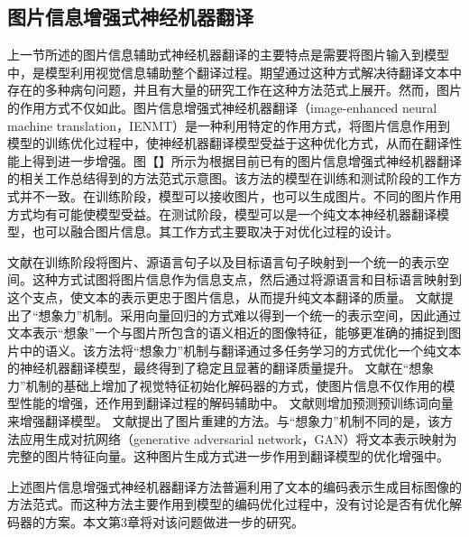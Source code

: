 \subsection{图片信息增强式神经机器翻译}

上一节所述的图片信息辅助式神经机器翻译的主要特点是需要将图片输入到模型中，是模型利用视觉信息辅助整个翻译过程。期望通过这种方式解决待翻译文本中存在的多种病句问题，并且有大量的研究工作在这种方法范式上展开。然而，图片的作用方式不仅如此。图片信息增强式神经机器翻译（image-enhanced neural machine translation，IENMT）是一种利用特定的作用方式，将图片信息作用到模型的训练优化过程中，使神经机器翻译模型受益于这种优化方式，从而在翻译性能上得到进一步增强。图【】所示为根据目前已有的图片信息增强式神经机器翻译的相关工作总结得到的方法范式示意图。该方法的模型在训练和测试阶段的工作方式并不一致。在训练阶段，模型可以接收图片，也可以生成图片。不同的图片作用方式均有可能使模型受益。在测试阶段，模型可以是一个纯文本神经机器翻译模型，也可以融合图片信息。其工作方式主要取决于对优化过程的设计。

文献\cite{54_DBLP:journals/mt/NakayamaN17,68_DBLP:journals/corr/KirosSZ14,115_saha-etal-2016-correlational}在训练阶段将图片、源语言句子以及目标语言句子映射到一个统一的表示空间。这种方式试图将图片信息作为信息支点，然后通过将源语言和目标语言映射到这个支点，使文本的表示更忠于图片信息，从而提升纯文本翻译的质量。
文献\cite{37_elliott-kadar-2017-imagination}提出了“想象力”机制。采用向量回归的方式难以得到一个统一的表示空间，因此通过文本表示“想象”一个与图片所包含的语义相近的图像特征，能够更准确的捕捉到图片中的语义。该方法将“想象力”机制与翻译通过多任务学习的方式优化一个纯文本的神经机器翻译模型，最终得到了稳定且显著的翻译质量提升。
文献\cite{56_zhou-etal-2018-visual}在“想象力”机制的基础上增加了视觉特征初始化解码器的方式，使图片信息不仅作用的模型性能的增强，还作用到翻译过程的解码辅助中。
文献\cite{116_DBLP:conf/naacl/HirasawaYMK19}则增加预测预训练词向量来增强翻译模型。
文献\cite{117_DBLP:journals/corr/abs-1910-02766}提出了图片重建的方法。与“想象力”机制不同的是，该方法应用生成对抗网络（generative adversarial network，GAN）将文本表示映射为完整的图片特征向量。这种图片生成方式进一步作用到翻译模型的优化增强中。

上述图片信息增强式神经机器翻译方法普遍利用了文本的编码表示生成目标图像的方法范式。而这种方法主要作用到模型的编码优化过程中，没有讨论是否有优化解码器的方案。本文第3章将对该问题做进一步的研究。